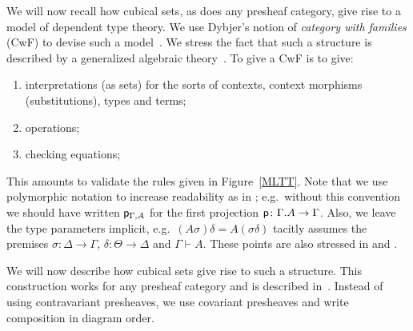 \documentclass[a4paper,USenglish,draft]{lipics}
\newcommand{\pp}{{\sf p}}
\begin{document}
We will now recall how cubical sets, as does any presheaf category,
give rise to a model of dependent type theory.  We use Dybjer's notion
of \emph{category with families} (CwF) to devise such a
model~\cite{Dybjer,Curien,Hofmann}.  We stress the fact that such a
structure is described by a generalized algebraic
theory~\cite{Cartmell}.  To give a CwF is to give:
\begin{enumerate}
\item interpretations (as sets) for the sorts of contexts, context
  morphisms (substitutions), types and terms;
\item operations;
\item checking equations;
\end{enumerate}
This amounts to validate the rules given in Figure~\ref{MLTT}.  Note
that we use polymorphic notation to increase readability as in
\cite{Cartmell,Dybjer}; e.g.\ without this convention we should have
written $\pp_{\Gamma, A}$ for the first projection $\pp \colon
\Gamma.A \to \Gamma$.  Also, we leave the type parameters implicit,
e.g.\ $(A \sigma) \delta = A (\sigma \delta)$ tacitly assumes the
premises $\sigma \colon \Delta \to \Gamma$, $\delta \colon \Theta \to
\Delta$ and $\Gamma \vdash A$.  These points are also stressed in
\cite[Sec.~1]{VoevodskyCMU} and \cite{Dybjer}.

We will now describe how cubical sets give rise to such a structure.
This construction works for any presheaf category and is described
in~\cite[Sec.~4]{Hofmann}.  Instead of using contravariant presheaves,
we use covariant presheaves and write composition in diagram order.
\end{document}
